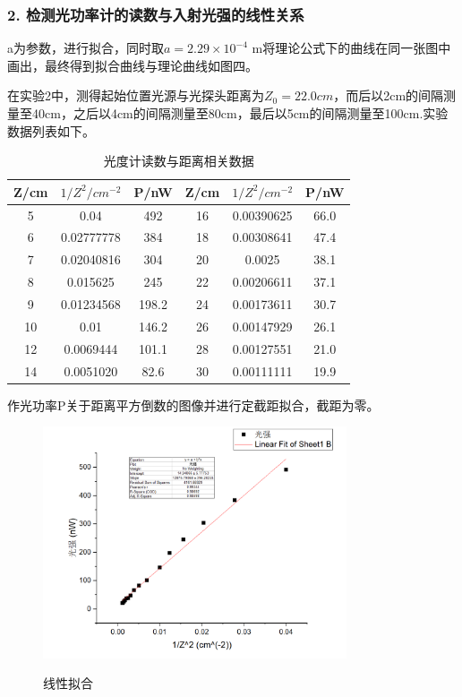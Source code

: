 \documentclass[12pt,a4paper,UTF8]{ctexart}
\begin{document}
\subsubsection*{2. 检测光功率计的读数与入射光强的线性关系}

a为参数，进行拟合，同时取$a=2.29×10^{-4}$ m将理论公式下的曲线在同一张图中画出，最终得到拟合曲线与理论曲线如图四。

在实验2中，测得起始位置光源与光探头距离为$Z_0=22.0cm$，而后以2cm的间隔测量至40cm，之后以4cm的间隔测量至80cm，最后以5cm的间隔测量至100cm.实验数据列表如下。

\begin{table}[htbp]
	\caption{光度计读数与距离相关数据}
	\centering
    \begin{tabular}{cccccc}
	\toprule
	Z/cm & $1/Z^2/cm^{-2}$&	P/nW & Z/cm	& $1/Z^2/cm^{-2}$&	P/nW\\
	\midrule
    5&0.04&492&16&0.00390625&66.0\\
	6&0.02777778&384&18&0.00308641&47.4\\
	7&0.02040816&304&20&0.0025&38.1\\
	8&0.015625&245&22&0.00206611&37.1\\
	9&0.01234568&198.2&24&0.00173611&30.7\\
	10&0.01&146.2&26&0.00147929&26.1\\
	12&0.0069444&101.1&28&0.00127551&21.0\\
	14&0.0051020&82.6&30&0.00111111&19.9\\
	\bottomrule
	\end{tabular}%
	\label{tab:data2}%
\end{table}%

作光功率P关于距离平方倒数的图像并进行定截距拟合，截距为零。

\begin{figure}[htbp]
	\caption{线性拟合}
	\centering
	\includegraphics[width=0.8\textwidth]{img//reg2.png}
	\label{fig:6}
\end{figure}
\end{document}
